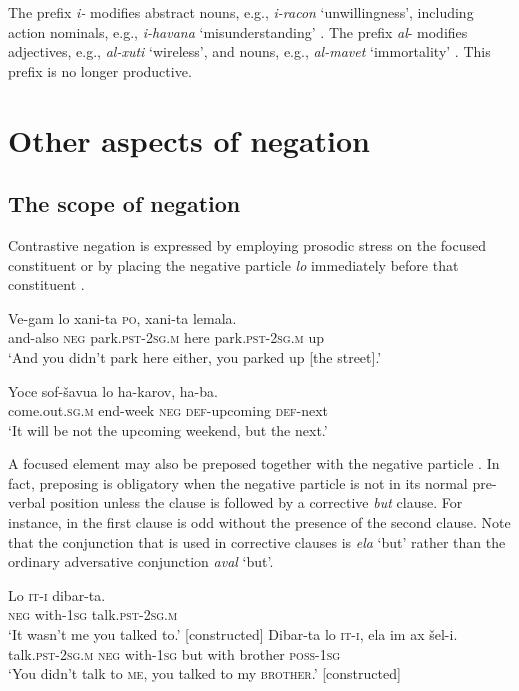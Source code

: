 \documentclass[output=paper,colorlinks,citecolor=brown]{langscibook}
\begin{document}
The prefix \textit{i{}-} modifies abstract nouns, e.g., \textit{i{}-racon} ‘unwillingness’, including action nominals, e.g., \textit{i{}-havana} ‘misunderstanding’ \citep[43--44]{Tzivoni1993}.
The prefix \textit{al}{}- modifies adjectives, e.g., \textit{al{}-xuti} ‘wireless’, and nouns, e.g., \textit{al-mavet} ‘immortality’ \citep[25--26]{Tzivoni1993}. This prefix is no longer productive.

\section{Other aspects of negation} \label{sec:heb:4}
\subsection{The scope of negation} \label{sec:heb:4.1}

Contrastive negation is expressed by employing prosodic stress on the focused constituent  or by placing the negative particle \textit{lo} immediately before that constituent  \citep[599]{Shor2020}.


\ea\label{ex:heb:35}
    \ea\label{ex:heb:35a} 
        \gll Ve-gam lo xani-ta \textsc{po}, xani-ta lemala.\\
             and-also \textsc{neg} park.\textsc{pst-2sg.m} here park.\textsc{pst-2sg.m} up\\
        \glt ‘And you didn’t park here either, you parked up [the street].’ \citep[599]{Shor2020}

    \ex\label{ex:heb:35b}
        \gll Yoce sof{}-šavua lo ha-karov, ha-ba.\\
            come.out.\textsc{sg.m} end{}-week \textsc{neg} \textsc{def}{}-upcoming \textsc{def}{}-next\\
        \glt ‘It will be not the upcoming weekend, but the next.’ \citep[599]{Shor2020}
    \z 
\z 

A focused element may also be preposed together with the negative particle . In fact, preposing is obligatory when the negative particle is not in its normal pre-verbal position unless the clause is followed by a corrective \textit{but} clause. For instance, in  the first clause is odd without the presence of the second clause. Note that the conjunction that is used in corrective clauses is \textit{ela} ‘but’ rather than the ordinary adversative conjunction \textit{aval} ‘but’.

\ea\label{ex:heb:36} 
    \ea\label{ex:heb:36a}
        \gll Lo \textsc{it-i} dibar-ta.\\
            \textsc{neg} with-\textsc{1sg} talk.\textsc{pst-2sg.m}\\
        \glt ‘It wasn’t me you talked to.’ [constructed]
    \ex\label{ex:heb:36b}
        \gll Dibar-ta lo \textsc{it-i}, ela im ax šel-i.\\
            talk.\textsc{pst-2sg.m} \textsc{neg} with-1\textsc{sg} but with brother \textsc{poss{}-1sg}\\
        \glt ‘You didn’t talk to \textsc{me}, you talked to my \textsc{brother}.’ [constructed]
    \z 
\z 
\end{document}
